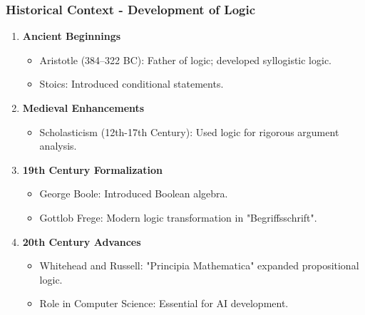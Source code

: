 \documentclass[aspectratio=169]{beamer}
\begin{document}
\begin{frame}[fragile]
    \frametitle{Historical Context - Development of Logic}
    \begin{enumerate}
        \item \textbf{Ancient Beginnings}
        \begin{itemize}
            \item Aristotle (384–322 BC): Father of logic; developed syllogistic logic.
            \item Stoics: Introduced conditional statements.
        \end{itemize}
        
        \item \textbf{Medieval Enhancements}
        \begin{itemize}
            \item Scholasticism (12th-17th Century): Used logic for rigorous argument analysis.
        \end{itemize}
        
        \item \textbf{19th Century Formalization}
        \begin{itemize}
            \item George Boole: Introduced Boolean algebra.
            \item Gottlob Frege: Modern logic transformation in "Begriffsschrift".
        \end{itemize}
        
        \item \textbf{20th Century Advances}
        \begin{itemize}
            \item Whitehead and Russell: "Principia Mathematica" expanded propositional logic.
            \item Role in Computer Science: Essential for AI development.
        \end{itemize}
    \end{enumerate}
\end{frame}
\end{document}
